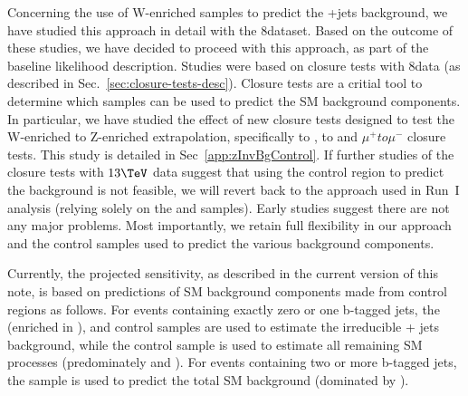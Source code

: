 Concerning the use of W-enriched samples to predict the \znunu +jets
background, we have studied this approach
in detail with the 8\TeV dataset. Based on the outcome of these studies,
we have decided to proceed with this approach, as part
of the baseline likelihood description. Studies were
based on closure tests with 8\TeV data
(as described in Sec.~\ref{sec:closure-tests-desc}). Closure tests are a critial
tool to determine which samples can be used to predict the SM
background components. In particular, we have studied the effect of
new closure tests designed to test the W-enriched to Z-enriched
extrapolation, specifically \mj to \gj, \mj to \mmj
and $\mu^{+} to \mu^{-}$ closure tests. This study is detailed in Sec~\ref{app:zInvBgControl}.
If further studies of the closure tests with $13\tev$
data suggest that using the \mj control region to predict the \znunu
background is not feasible, we will revert back to the approach
used in Run~I analysis (\ie relying solely on the \zll and \gj
samples). Early studies suggest there are not any major problems.
Most importantly, we retain full flexibility in our approach and the
control samples used to predict the various background components.

Currently, the projected sensitivity, as described in the current
version of this note, is based on predictions of SM background
components made from control regions as follows. For events containing
exactly zero or one b-tagged jets, the \mj (enriched in \wej), \gj and
\mmj control samples are used to estimate the irreducible \znunu + jets
background, while the \mj control sample is used to estimate all
remaining SM processes (predominately \wj and \ttbar). For events
containing two or more b-tagged jets, the \mj sample is
used to predict the total SM background (dominated by \ttbar).

